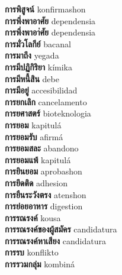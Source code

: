 \textbf{ การพิสูจน์  } konfirmashon \\
\textbf{ การพึ่งพาอาศัย  } dependensia \\
\textbf{ การพึ่งพาอา่ศัย  } dependensia \\
\textbf{ การมั่วโลกีย์  } bacanal \\
\textbf{ การมาถึง  } yegada \\
\textbf{ การมีปฏิกิริยา  } kímika \\
\textbf{ การมีหนี้สิน  } debe \\
\textbf{ การมีอยู่  } accesibilidad \\
\textbf{ การยกเลิก  } cancelamento \\
\textbf{ การยศาสตร์  } bioteknologia \\
\textbf{ การยอม  } kapitulá \\
\textbf{ การยอมรับ  } afirmá \\
\textbf{ การยอมสละ  } abandono \\
\textbf{ การยอมแพ้  } kapitulá \\
\textbf{ การยินยอม  } aprobashon \\
\textbf{ การยึดติด  } adhesion \\
\textbf{ การยืนระวังตรง  } atenshon \\
\textbf{ การย่อยอาหาร  } digestion \\
\textbf{ การรณรงค์  } kousa \\
\textbf{ การรณรงค์ของผู้สมัคร  } candidatura \\
\textbf{ การรณรงค์หาเสียง  } candidatura \\
\textbf{ การรบ  } konflikto \\
\textbf{ การรวมกลุ่ม  } kombiná \\
